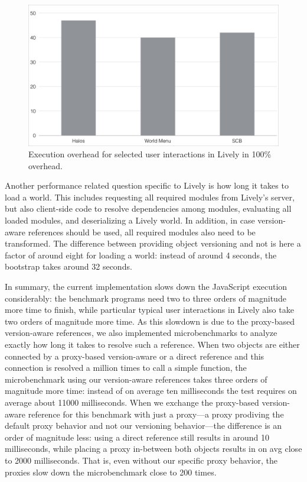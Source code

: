 \begin{figure}[h]
    \centering
    \includegraphics[width=\textwidth]{figures/livelyInteractionsOverhead.pdf}
    \caption{Execution overhead for selected user interactions in Lively in 100\% overhead.}
    \label{fig:LivelyInteractionsOverhead}
\end{figure}

Another performance related question specific to Lively is how long it takes to load a world.
This includes requesting all required modules from Lively's server, but also client-side code to resolve dependencies among modules, evaluating all loaded modules, and deserializing a Lively world.
In addition, in case version-aware references should be used, all required modules also need to be transformed.
The difference between providing object versioning and not is here a factor of around eight for loading a world: instead of around 4 seconds, the bootstrap takes around 32 seconds.

In summary, the current implementation slows down the JavaScript execution considerably: the benchmark programs need two to three orders of magnitude more time to finish, while particular typical user interactions in Lively also take two orders of magnitude more time.
As this slowdown is due to the proxy-based version-aware references, we also implemented microbenchmarks to analyze exactly how long it takes to resolve such a reference.
When two objects are either connected by a proxy-based version-aware or a direct reference and this connection is resolved a million times to call a simple function, the microbenchmark using our version-aware references takes three orders of magnitude more time: instead of on average ten milliseconds the test requires on average about 11000 milliseconds.
When we exchange the proxy-based version-aware reference for this benchmark with just a proxy---a proxy prodiving the default proxy behavior and not our versioning behavior---the difference is an order of magnitude less: using a direct reference still results in around 10 milliseconds, while placing a proxy in-between both objects results in on avg close to 2000 milliseconds.
That is, even without our specific proxy behavior, the proxies slow down the microbenchmark close to 200 times.

